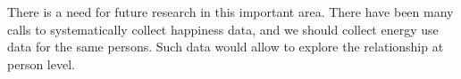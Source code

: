 \documentclass[10pt, letterpaper]{article}
\begin{document}
\begin{spacing}{1.5}
There is a need for future research in this important area. There have been many
calls to systematically collect happiness data, and we should collect energy use data for the same persons. Such data would allow
to explore the relationship  at person level. %






\end{spacing}
\end{document}
